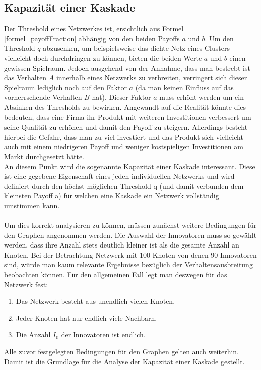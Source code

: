 \documentclass[12pt]{article}
\begin{document}
\subsection{Kapazität einer Kaskade}
Der Threshold eines Netzwerkes ist, ersichtlich aus Formel \ref{formel_payoffFraction} abhängig von den beiden Payoffs $a$ und $b$. Um den Threshold $q$ abzusenken, um beispielsweise das dichte Netz eines Clusters vielleicht doch durchdringen zu können, bieten die beiden Werte $a$ und $b$ einen gewissen Spielraum. Jedoch ausgehend von der Annahme, dass man bestrebt ist das Verhalten $A$ innerhalb eines Netzwerks zu verbreiten, verringert sich dieser Spielraum lediglich noch auf den Faktor $a$ (da man keinen Einfluss auf das vorherrschende Verhalten $B$ hat). Dieser Faktor $a$ muss erhöht werden um ein Absinken des Thresholds zu bewirken. Angewandt auf die Realität könnte dies bedeuten, dass eine Firma ihr Produkt mit weiteren Investitionen verbessert um seine Qualität zu erhöhen und damit den Payoff zu steigern. Allerdings besteht hierbei die Gefahr, dass man zu viel investiert und das Produkt sich vielleicht auch mit einem niedrigeren Payoff und weniger kostspieligen Investitionen am Markt durchgesetzt hätte.\\
An diesem Punkt wird die sogenannte Kapazität einer Kaskade interessant. Diese ist eine gegebene Eigenschaft eines jeden individuellen Netzwerks und wird definiert durch den höchst möglichen Threshold q (und damit verbunden dem kleinsten Payoff a) für welchen eine Kaskade ein Netzwerk vollständig umstimmen kann.\\\\
Um dies korrekt analysieren zu können, müssen zunächst weitere Bedingungen für den Graphen angenommen werden. Die Auswahl der Innovatoren muss so gewählt werden, dass ihre Anzahl stets deutlich kleiner ist als die gesamte Anzahl an Knoten. Bei der Betrachtung Netzwerk mit $100$ Knoten von denen $90$ Innovatoren sind, würde man kaum relevante Ergebnisse bezüglich der Verhaltensausbreitung beobachten können. Für den allgemeinen Fall legt man deswegen für das Netzwerk fest:
\begin{enumerate}
\item Das Netzwerk besteht aus unendlich vielen Knoten.
\item Jeder Knoten hat nur endlich viele Nachbarn.
\item Die Anzahl $I_0$ der Innovatoren ist endlich.
\end{enumerate}
Alle zuvor festgelegten Bedingungen für den Graphen gelten auch weiterhin. Damit ist die Grundlage für die Analyse der Kapazität einer Kaskade gestellt.
\end{document}
